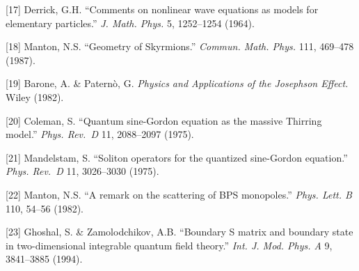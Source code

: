 \documentclass[a4paper,11pt]{article}
\begin{document}
{[}17{]} Derrick, G.H. ``Comments on nonlinear wave equations as models
for elementary particles.'' \emph{J. Math. Phys.} 5, 1252--1254 (1964).

{[}18{]} Manton, N.S. ``Geometry of Skyrmions.'' \emph{Commun. Math.
Phys.} 111, 469--478 (1987).

{[}19{]} Barone, A. \& Paternò, G. \emph{Physics and Applications of the
Josephson Effect.} Wiley (1982).

{[}20{]} Coleman, S. ``Quantum sine-Gordon equation as the massive
Thirring model.'' \emph{Phys. Rev.~D} 11, 2088--2097 (1975).

{[}21{]} Mandelstam, S. ``Soliton operators for the quantized
sine-Gordon equation.'' \emph{Phys. Rev.~D} 11, 3026--3030 (1975).

{[}22{]} Manton, N.S. ``A remark on the scattering of BPS monopoles.''
\emph{Phys. Lett. B} 110, 54--56 (1982).

{[}23{]} Ghoshal, S. \& Zamolodchikov, A.B. ``Boundary S matrix and
boundary state in two-dimensional integrable quantum field theory.''
\emph{Int. J. Mod. Phys. A} 9, 3841--3885 (1994).
\end{document}
